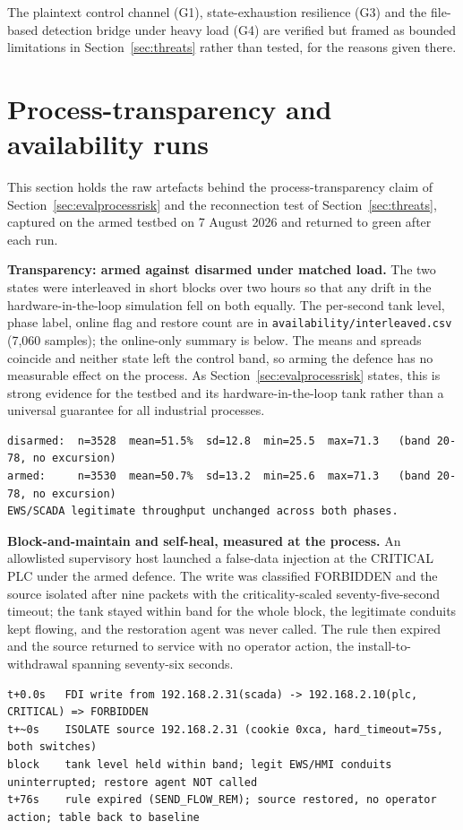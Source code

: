 \noindent The plaintext control channel (G1), state-exhaustion resilience (G3) and the file-based detection bridge under heavy load (G4) are verified but framed as bounded limitations in Section~\ref{sec:threats} rather than tested, for the reasons given there.

\FloatBarrier
\section{Process-transparency and availability runs}
\label{appx:availability}

This section holds the raw artefacts behind the process-transparency claim of Section~\ref{sec:evalprocessrisk} and the reconnection test of Section~\ref{sec:threats}, captured on the armed testbed on 7 August 2026 and returned to green after each run.

\noindent\textbf{Transparency: armed against disarmed under matched load.} The two states were interleaved in short blocks over two hours so that any drift in the hardware-in-the-loop simulation fell on both equally. The per-second tank level, phase label, online flag and restore count are in \texttt{availability/interleaved.csv} (7{,}060 samples); the online-only summary is below. The means and spreads coincide and neither state left the control band, so arming the defence has no measurable effect on the process. As Section~\ref{sec:evalprocessrisk} states, this is strong evidence for the testbed and its hardware-in-the-loop tank rather than a universal guarantee for all industrial processes.
\begin{lstlisting}[style=carsdump,caption={Transparency: online-only level statistics per phase, from \texttt{interleaved.csv}.},label={lst:ev_transparency}]
disarmed:  n=3528  mean=51.5%  sd=12.8  min=25.5  max=71.3   (band 20-78, no excursion)
armed:     n=3530  mean=50.7%  sd=13.2  min=25.6  max=71.3   (band 20-78, no excursion)
EWS/SCADA legitimate throughput unchanged across both phases.
\end{lstlisting}

\noindent\textbf{Block-and-maintain and self-heal, measured at the process.} An allowlisted supervisory host launched a false-data injection at the CRITICAL PLC under the armed defence. The write was classified FORBIDDEN and the source isolated after nine packets with the criticality-scaled seventy-five-second timeout; the tank stayed within band for the whole block, the legitimate conduits kept flowing, and the restoration agent was never called. The rule then expired and the source returned to service with no operator action, the install-to-withdrawal spanning seventy-six seconds.
\begin{lstlisting}[style=carsdump,caption={Block-and-maintain under attack, then self-heal, from the armed run.},label={lst:ev_selfheal}]
t+0.0s   FDI write from 192.168.2.31(scada) -> 192.168.2.10(plc, CRITICAL) => FORBIDDEN
t+~0s    ISOLATE source 192.168.2.31 (cookie 0xca, hard_timeout=75s, both switches)
block    tank level held within band; legit EWS/HMI conduits uninterrupted; restore agent NOT called
t+76s    rule expired (SEND_FLOW_REM); source restored, no operator action; table back to baseline
\end{lstlisting}

